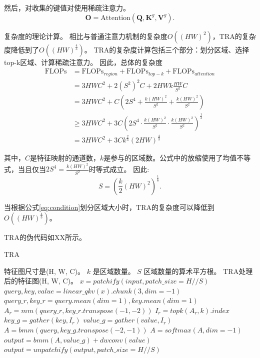 然后，对收集的键值对使用稀疏注意力。
\begin{equation}
	\mathbf{O} = \mathrm{Attention}(\mathbf{Q}, \mathbf{K}^g, \mathbf{V}^g).
\end{equation}


复杂度的理论计算。
相比与普通注意力机制的复杂度$O((HW)^2)$，TRA的复杂度降低到了$O((HW)^\frac{4}{3})$。
TRA的复杂度计算包括三个部分：划分区域、选择top-k区域、计算稀疏注意力。
因此，总体的复杂度
\begin{equation}\label{eq:complexity}
	\begin{aligned}
		\mathrm{FLOPs} &= \mathrm{FLOPs}_{region} + \mathrm{FLOPs}_{top-k} + \mathrm{FLOPs}_{attention} \\
		&= 3HWC^2 + 2 (S^2)^2 C + 2HW k \frac{HW}{S^2} C \\
		&= 3HWC^2 + C (2S^4 + \frac{k(HW)^2}{S^2} + \frac{k(HW)^2}{S^2}) \\
		&\geq 3HWC^2 + 3C(2S^4 \cdot \frac{k(HW)^2}{S^2} \cdot \frac{k(HW)^2}{S^2})^\frac{1}{3} \\
		&= 3HWC^2 + 3Ck^\frac{2}{3}(2HW)^\frac{4}{3}
	\end{aligned}
\end{equation}

其中，$C$是特征映射的通道数，$k$是参与的区域数。公式中的放缩使用了均值不等式，当且仅当$2S^4 = \frac{k(HW)^2}{S^2}$时等式成立。
因此:
\begin{equation}\label{eq:condition}
	S = (\frac{k}{2}(HW)^2)^\frac{1}{6}.
\end{equation}

当根据公式\ref{eq:condition}划分区域大小时，TRA的复杂度可以降低到$O((HW)^\frac{4}{3})$。

TRA的伪代码如XX所示。
\begin{algorithm}[h]
	\caption{TRA}
	\label{alg:code}
	\begin{algorithmic}[1]
		\REQUIRE 特征图尺寸是(H, W, C)。
		$k$ 是区域数量。
		$S$ 区域数量的算术平方根。
		\ENSURE TRA处理后的特征图(H, W, C)。		
		\STATE $x = \mathit{patchify}(input, \mathit{patch\_size}=H//S)$
		\STATE $query, key, value = \mathit{linear\_qkv}(x).chunk(3, \mathit{dim}=-1)$
		\STATE $query\_r, key\_r = query.mean(\mathit{dim}=1), key.mean(\mathit{dim}=1)$
		\STATE $A_r = \mathit{mm}(query\_r, key\_r.transpose(-1, -2))$
		\STATE $I_r = \mathit{topk}(A_r, k).index$
		\STATE $key\_g = \mathit{gather}(key, I_r)$  
		\STATE $value\_g = \mathit{gather}(value, I_r)$  
		\STATE $A = \mathit{bmm}(query, key\_g.transpose(-2, -1))$
		\STATE $A = \mathit{softmax}(A, \mathit{dim}=-1)$
		\STATE $output = \mathit{bmm}(A, value\_g) + \mathit{dwconv}(value)$
		\STATE $output = \mathit{unpatchify}(output, \mathit{patch\_size}=H//S)$
	\end{algorithmic}
\end{algorithm}


